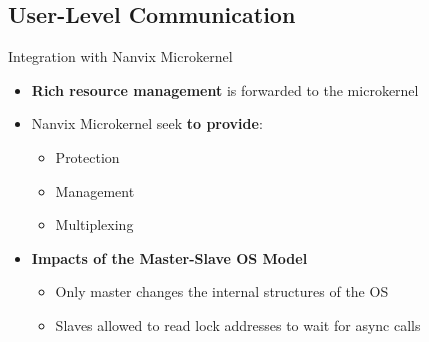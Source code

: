 	\subsection{User-Level Communication}

		\begin{frame}[fragile]{Integration with Nanvix Microkernel}

			\begin{itemize}
				\item \textbf{Rich resource management} is forwarded to the microkernel
			\end{itemize}

			\begin{itemize}
				\item Nanvix Microkernel seek \textbf{to provide}:
				\begin{itemize}
					\item Protection
					\item Management
					\item Multiplexing
				\end{itemize}
			\end{itemize}

			\begin{itemize}
				\item \textbf{Impacts of the Master-Slave OS Model}
				\begin{itemize}
					\item Only master changes the internal structures of the OS
					\item Slaves allowed to read lock addresses to wait for async calls
				\end{itemize}
			\end{itemize}

		\end{frame}

			


